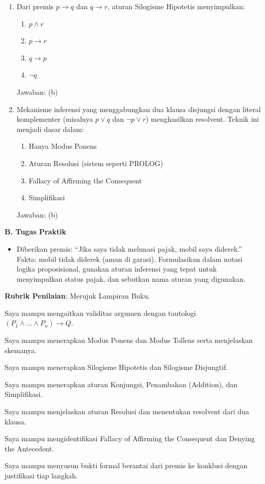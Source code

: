 \documentclass[../main]{subfiles}
\begin{document}
\begin{asesmen}
\begin{enumerate}
  \item Dari premis $p \rightarrow q$ dan $q \rightarrow r$, aturan Silogisme Hipotetis menyimpulkan:
  \begin{enumerate}
    \item $p \wedge r$
    \item $p \rightarrow r$
    \item $q \rightarrow p$
    \item $\neg q$
  \end{enumerate}
  Jawaban: (b)

  \item Mekanisme inferensi yang menggabungkan dua klausa disjungsi dengan literal komplementer (misalnya $p \vee q$ dan $\neg p \vee r$) menghasilkan resolvent. Teknik ini menjadi dasar dalam:
  \begin{enumerate}
    \item Hanya Modus Ponens
    \item Aturan Resolusi (sistem seperti PROLOG)
    \item Fallacy of Affirming the Consequent
    \item Simplifikasi
  \end{enumerate}
  Jawaban: (b)
\end{enumerate}

\textbf{B. Tugas Praktik}
\begin{itemize}
  \item Diberikan premis: ``Jika saya tidak melunasi pajak, mobil saya diderek.'' Fakta: mobil tidak diderek (aman di garasi). Formulasikan dalam notasi logika proposisional, gunakan aturan inferensi yang tepat untuk menyimpulkan status pajak, dan sebutkan nama aturan yang digunakan.
\end{itemize}

\textbf{Rubrik Penilaian}: Merujuk Lampiran Buku.
\end{asesmen}


\begin{checklist}
  \item Saya mampu mengaitkan validitas argumen dengan tautologi $(P_1 \wedge \ldots \wedge P_n) \rightarrow Q$.
  \item Saya mampu menerapkan Modus Ponens dan Modus Tollens serta menjelaskan skemanya.
  \item Saya mampu menerapkan Silogisme Hipotetis dan Silogisme Disjungtif.
  \item Saya mampu menerapkan aturan Konjungsi, Penambahan (Addition), dan Simplifikasi.
  \item Saya mampu menjelaskan aturan Resolusi dan menentukan resolvent dari dua klausa.
  \item Saya mampu mengidentifikasi Fallacy of Affirming the Consequent dan Denying the Antecedent.
  \item Saya mampu menyusun bukti formal berantai dari premis ke konklusi dengan justifikasi tiap langkah.
\end{checklist}
\end{document}
